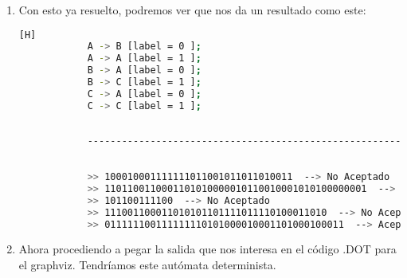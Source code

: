 \documentclass{article}
\begin{document}
\begin{enumerate}
            Ahora nos falta poder trabajar con el código en Graphviz, con un código proporcionado por el profesor, tenemos que hacer que nuestro programa en Python devuelva una entrada como esta:

        \begin{lstlisting}[language=bash,caption={Definición del resultado esperado para Graphviz}][H]
            A -> B [label = 0 ];
            A -> A [label = 1 ];
            B -> A [label = 0 ];
            B -> C [label = 1 ];
            C -> A [label = 0 ];
            C -> C [label = 1 ];
    	\end{lstlisting}

        En base a eso, se agrego una función de un 'for' anidado que itera por cada línea de la matriz 'delta' y nos devuelve los valores de las filas y columnas, agregando a esta un valor (la locación adecuada según el autómata).

        

        Esta función la veremos ejemplificada en las lineas 17-23, donde recolectara el valor primero en cada fila (row) y luego en cada columna (column), para ejercerlo en el formato que hemos construido para que lo imprima. 

        \item Con esto ya resuelto, podremos ver que nos da un resultado como este: 

        \begin{lstlisting}[language=bash,caption={Definición del resultado esperado para Graphviz}][H]
            A -> B [label = 0 ];
            A -> A [label = 1 ];
            B -> A [label = 0 ];
            B -> C [label = 1 ];
            C -> A [label = 0 ];
            C -> C [label = 1 ];
            
            
            ------------------------------------------------------------
            
            
            >> 100010001111111011001011011010011  --> No Aceptado
            >> 1101100110001101010000010110010001010100000001  --> No Aceptado
            >> 101100111100  --> No Aceptado
            >> 111001100011010101101111011110100011010  --> No Aceptado
            >> 011111100111111110101000010001101000100011  --> Aceptado...
    	\end{lstlisting}

        \item Ahora procediendo a pegar la salida que nos interesa en el código .DOT para el graphviz. Tendríamos este autómata determinista.


\end{enumerate}
\end{document}
